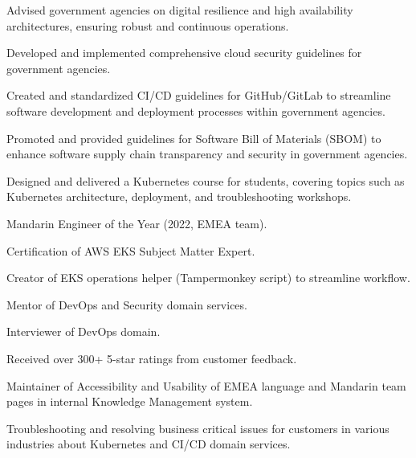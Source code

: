 \documentclass[]{deedy-resume-openfont}
\begin{document}
\begin{minipage}[t]{1\textwidth}
\null\hfill{}
\begin{tightemize}
    \item Advised government agencies on digital resilience and high availability architectures, ensuring robust and continuous operations.
    \item Developed and implemented comprehensive cloud security guidelines for government agencies.
    \item Created and standardized CI/CD guidelines for GitHub/GitLab to streamline software development and deployment processes within government agencies.
    \item Promoted and provided guidelines for Software Bill of Materials (SBOM) to enhance software supply chain transparency and security in government agencies.
\end{tightemize}
\sectionsep

\null\hfill{}
\begin{tightemize}
    \item Designed and delivered a Kubernetes course for students, covering topics such as Kubernetes architecture, deployment, and troubleshooting workshops.
\end{tightemize}
\sectionsep


\null\hfill{}
\begin{tightemize}
    \item Mandarin Engineer of the Year (2022, EMEA team).
    \item Certiﬁcation of AWS EKS Subject Matter Expert.
    \item Creator of EKS operations helper (Tampermonkey script) to streamline workﬂow.
    \item Mentor of DevOps and Security domain services.
    \item Interviewer of DevOps domain.
    \item Received over 300+ 5-star ratings from customer feedback.
    \item Maintainer of Accessibility and Usability of EMEA language and Mandarin team pages in internal Knowledge Management system.
    \item Troubleshooting and resolving business critical issues for customers in various industries about Kubernetes and CI/CD domain services.
\end{tightemize}
\sectionsep


\end{minipage}
\end{document}
